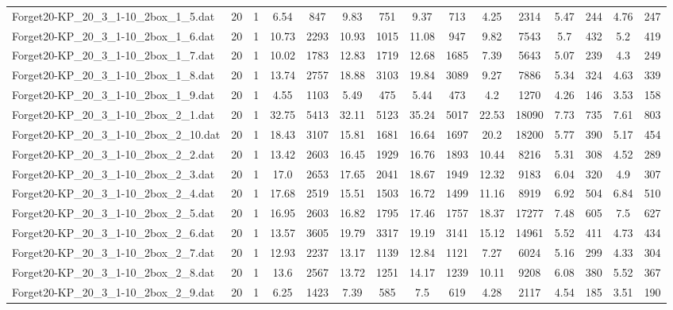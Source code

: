\begin{table}[!ht]
{\begin{tabular}{lcccccccccccccc}
Forget20-KP\_20\_3\_1-10\_2box\_1\_5.dat & 20 & 1 & 6.54 & 847 & 9.83 & 751 & 9.37 & 713 & 4.25 & 2314 & 5.47 & 244 & 4.76 & 247 \\
Forget20-KP\_20\_3\_1-10\_2box\_1\_6.dat & 20 & 1 & 10.73 & 2293 & 10.93 & 1015 & 11.08 & 947 & 9.82 & 7543 & 5.7 & 432 & 5.2 & 419 \\
Forget20-KP\_20\_3\_1-10\_2box\_1\_7.dat & 20 & 1 & 10.02 & 1783 & 12.83 & 1719 & 12.68 & 1685 & 7.39 & 5643 & 5.07 & 239 & 4.3 & 249 \\
Forget20-KP\_20\_3\_1-10\_2box\_1\_8.dat & 20 & 1 & 13.74 & 2757 & 18.88 & 3103 & 19.84 & 3089 & 9.27 & 7886 & 5.34 & 324 & 4.63 & 339 \\
Forget20-KP\_20\_3\_1-10\_2box\_1\_9.dat & 20 & 1 & 4.55 & 1103 & 5.49 & 475 & 5.44 & 473 & 4.2 & 1270 & 4.26 & 146 & 3.53 & 158 \\
Forget20-KP\_20\_3\_1-10\_2box\_2\_1.dat & 20 & 1 & 32.75 & 5413 & 32.11 & 5123 & 35.24 & 5017 & 22.53 & 18090 & 7.73 & 735 & 7.61 & 803 \\
Forget20-KP\_20\_3\_1-10\_2box\_2\_10.dat & 20 & 1 & 18.43 & 3107 & 15.81 & 1681 & 16.64 & 1697 & 20.2 & 18200 & 5.77 & 390 & 5.17 & 454 \\
Forget20-KP\_20\_3\_1-10\_2box\_2\_2.dat & 20 & 1 & 13.42 & 2603 & 16.45 & 1929 & 16.76 & 1893 & 10.44 & 8216 & 5.31 & 308 & 4.52 & 289 \\
Forget20-KP\_20\_3\_1-10\_2box\_2\_3.dat & 20 & 1 & 17.0 & 2653 & 17.65 & 2041 & 18.67 & 1949 & 12.32 & 9183 & 6.04 & 320 & 4.9 & 307 \\
Forget20-KP\_20\_3\_1-10\_2box\_2\_4.dat & 20 & 1 & 17.68 & 2519 & 15.51 & 1503 & 16.72 & 1499 & 11.16 & 8919 & 6.92 & 504 & 6.84 & 510 \\
Forget20-KP\_20\_3\_1-10\_2box\_2\_5.dat & 20 & 1 & 16.95 & 2603 & 16.82 & 1795 & 17.46 & 1757 & 18.37 & 17277 & 7.48 & 605 & 7.5 & 627 \\
Forget20-KP\_20\_3\_1-10\_2box\_2\_6.dat & 20 & 1 & 13.57 & 3605 & 19.79 & 3317 & 19.19 & 3141 & 15.12 & 14961 & 5.52 & 411 & 4.73 & 434 \\
Forget20-KP\_20\_3\_1-10\_2box\_2\_7.dat & 20 & 1 & 12.93 & 2237 & 13.17 & 1139 & 12.84 & 1121 & 7.27 & 6024 & 5.16 & 299 & 4.33 & 304 \\
Forget20-KP\_20\_3\_1-10\_2box\_2\_8.dat & 20 & 1 & 13.6 & 2567 & 13.72 & 1251 & 14.17 & 1239 & 10.11 & 9208 & 6.08 & 380 & 5.52 & 367 \\
Forget20-KP\_20\_3\_1-10\_2box\_2\_9.dat & 20 & 1 & 6.25 & 1423 & 7.39 & 585 & 7.5 & 619 & 4.28 & 2117 & 4.54 & 185 & 3.51 & 190 \\

\end{tabular}}
\end{table}
